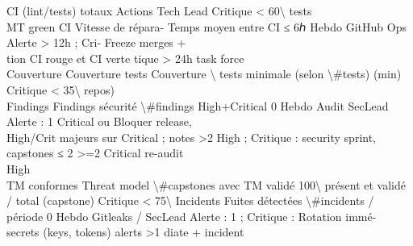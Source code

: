 CI (lint/tests)    totaux                                           Actions    Tech Lead Critique \textless{} 60\textbackslash{}%
tests\\
MT green CI    Vitesse de répara- Temps moyen entre CI       ≤ 6ℎ       Hebdo      GitHub     Ops       Alerte \textgreater{} 12h ; Cri-       Freeze merges +\\
tion CI            rouge et CI verte                                                     tique \textgreater{} 24h               task force\\
Couverture     Couverture tests Couverture \textbackslash{}%
tests          minimale (selon \textbackslash{}#tests)                       (min)                                      Critique \textless{} 35\textbackslash{}%
repos)\\
Findings       Findings sécurité \textbackslash{}#findings High+Critical     0          Hebdo      Audit      SecLead   Alerte : 1 Critical ou    Bloquer release,\\
High/Crit      majeurs sur                                   Critical ;            notes                \textgreater{}2 High ; Critique :      security sprint,\\
capstones                                     ≤ 2                                        \textgreater{}=2 Critical              re-audit\\
High\\
TM conformes Threat model         \textbackslash{}#capstones avec TM validé 100\textbackslash{}%
présent et validé    / total                               (capstone)                      Critique \textless{} 75\textbackslash{}%
Incidents    Fuites détectées     \textbackslash{}#incidents / période      0           Hebdo      Gitleaks / SecLead   Alerte : 1 ; Critique :   Rotation immé-\\
secrets      (keys, tokens)                                                        alerts               \textgreater{}1                        diate + incident\\
